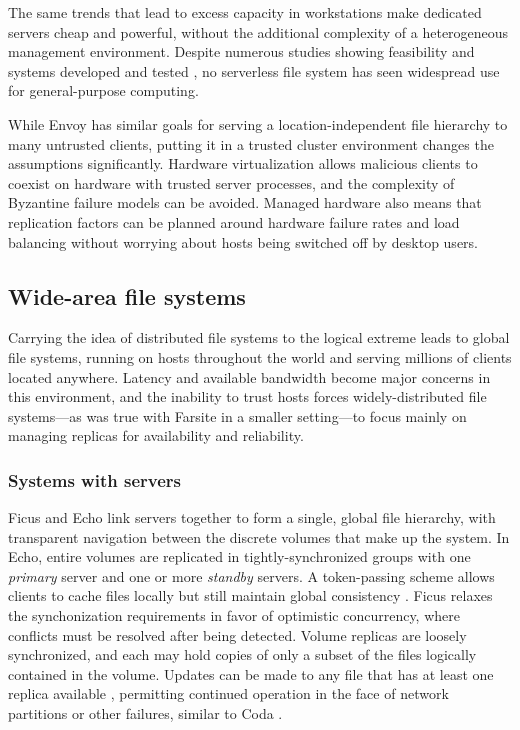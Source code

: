 The same trends that lead to excess capacity in workstations make dedicated servers cheap and powerful, without the additional complexity of a heterogeneous management environment. Despite numerous studies showing feasibility \cite{bolosky,douceur99,douceur01} and systems developed and tested \cite{adya,walker}, no serverless file system has seen widespread use for general-purpose computing.

While Envoy has similar goals for serving a location-independent file hierarchy to many untrusted clients, putting it in a trusted cluster environment changes the assumptions significantly. Hardware virtualization allows malicious clients to coexist on hardware with trusted server processes, and the complexity of Byzantine failure models can be avoided. Managed hardware also means that replication factors can be planned around hardware failure rates and load balancing without worrying about hosts being switched off by desktop users.

\subsection{Wide-area file systems}

Carrying the idea of distributed file systems to the logical extreme leads to global file systems, running on hosts throughout the world and serving millions of clients located anywhere. Latency and available bandwidth become major concerns in this environment, and the inability to trust hosts forces widely-distributed file systems---as was true with Farsite in a smaller setting---to focus mainly on managing replicas for availability and reliability.

\subsubsection{Systems with servers}

Ficus \cite{guy} and Echo \cite{birrell93} link servers together to form a single, global file hierarchy, with transparent navigation between the discrete volumes that make up the system. In Echo, entire volumes are replicated in tightly-synchronized groups with one \emph{primary} server and one or more \emph{standby} servers. A token-passing scheme allows clients to cache files locally but still maintain global consistency \cite{mann}. Ficus relaxes the synchonization requirements in favor of optimistic concurrency, where conflicts must be resolved after being detected. Volume replicas are loosely synchronized, and each may hold copies of only a subset of the files logically contained in the volume. Updates can be made to any file that has at least one replica available \cite{popek}, permitting continued operation in the face of network partitions or other failures, similar to Coda \cite{kistler}.

